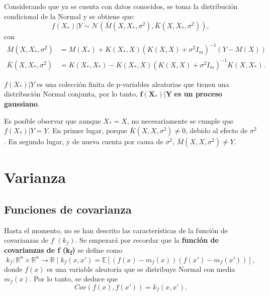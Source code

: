 Considerando que ya se cuenta con datos conocidos, se toma la distribuci\'on condicional de la Normal y se obtiene que:
\begin{equation*}
    f(X_*)|Y
    \sim \mathcal{N}
    (\bar{M}(X,X_*,\sigma^2),\bar{K}(X,X_*,\sigma^2)),
\end{equation*}
con
\begin{equation*}
\begin{aligned}
    \bar{M}(X,X_*,\sigma^2) &= M(X_*) + K(X_*,X)(K(X,X) + \sigma^2I_m)^{-1}(Y - M(X)) \\
    \bar{K}(X,X_*,\sigma^2) &= K(X_*,X_*) - K(X_*,X)(K(X,X) + \sigma^2I_m)^{-1}K(X,X_*).
\end{aligned}
\end{equation*}

\begin{obs}
    $f(X_*)|Y$ es una colección finita de p-variables aleatorias que tienen una distribuci\'on Normal conjunta, por lo tanto,
    $\mathbf{f(X_*)|Y}$ \textbf{ es un proceso gaussiano}. 
\end{obs}

Es posible observar que aunque $X_* = X$, no necesariamente se cumple que $f(X_*)|Y = Y$. En primer lugar, porque $\bar{K}(X,X,\sigma^2) \neq 0$, debido al efecto de $\sigma^2$. En segundo lugar, y de nueva cuenta por causa de $\sigma^2$, $\bar{M}(X,X,\sigma^2) \neq Y$.

\section{Varianza}

\subsection{Funciones de covarianza}

Hasta el momento, no se han descrito las caracter\'isticas de la funci\'on de covarianzas de $f$ $(k_f)$. Se empezar\'a por recordar que la \textbf{función de covarianzas de f (k\textsubscript{f})} se define como 
\begin{equation*}
    k_f: \mathbb{R}^n \times \mathbb{R}^n \rightarrow \mathbb{R} 
    \mid
    k_f(x, x') = \mathbb{E}[(f(x) - m_f(x))(f(x') - m_f(x'))],
\end{equation*}
donde $f(x)$ es una variable aleatoria que se distribuye Normal con media $m_f(x)$. Por lo tanto, se deduce que 
\begin{equation*}
    Cov(f(x),f(x')) = k_f(x,x').
\end{equation*}


